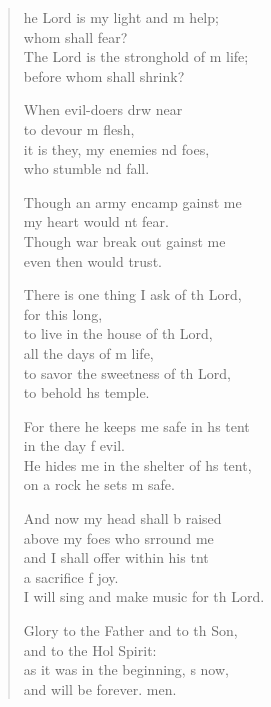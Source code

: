 \begin{verse}
  \begin{patverse}
he Lord is my light and m help;\Med\\
whom shall  fear?\\
The Lord is the stronghold of m life;\Med\\
before whom shall  shrink?

When evil-doers drw near\Med\\
to devour m flesh,\\
it is they, my enemies nd foes,\Med\\
who stumble nd fall.

Though an army encamp gainst me\Med\\
my heart would nt fear.\\
Though war break out gainst me\Med\\
even then would  trust.

There is one thing I ask of th Lord,\Med\\
for this  long,\\
to live in the house of th Lord,\Med\\
all the days of m life,\\
to savor the sweetness of th Lord,\Med\\
to behold h\pointup{\i}s temple.

For there he keeps me safe in h\pointup{\i}s tent\Med\\
in the day f evil.\\
He hides me in the shelter of h\pointup{\i}s tent,\Med\\
on a rock he sets m safe.

And now my head shall b raised\Med\\
above my foes who srround me\\
and I shall offer within his tnt\Flex\\
a sacrifice f joy.\Med\\
I will sing and make music for th Lord.

Glory to the Father and to th Son,\Med\\
and to the Hol Spirit:\\
as it was in the beginning, \pointup{\i}s now,\Med\\
and will be forever. men.
  \end{patverse}
\end{verse}
